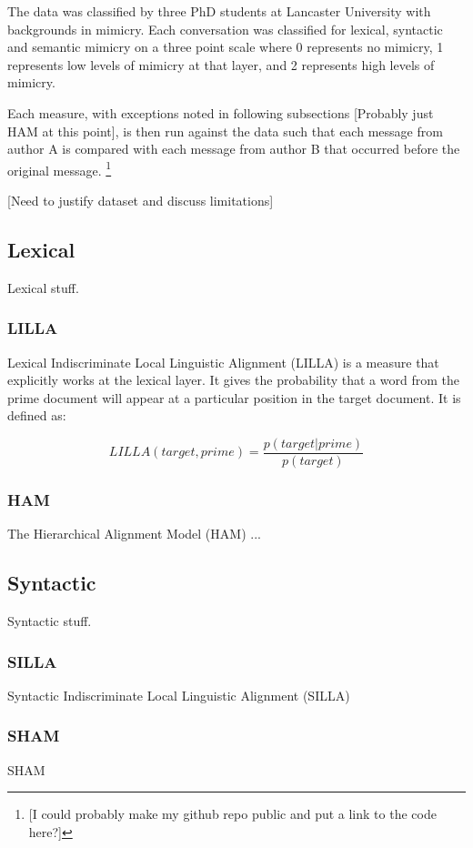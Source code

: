 \documentclass[conference]{IEEEtran}
\begin{document}
The data was classified by three PhD students at Lancaster University with backgrounds in mimicry. Each 
conversation was classified for lexical, syntactic and semantic mimicry on a three point scale where 0 
represents no mimicry, 1 represents low levels of mimicry at that layer, and 2 represents high levels 
of mimicry.

Each measure, with exceptions noted in following subsections [Probably just HAM at this point],
is then run against the data such that each message from author A is compared with each message from 
author B that occurred before the original message.
\footnote{[I could probably make my github repo public and put a link to the code here?]}

[Need to justify dataset and discuss limitations]


\subsection{Lexical}
Lexical stuff.

\subsubsection{LILLA}
Lexical Indiscriminate Local Linguistic Alignment (LILLA)\cite{wang2014linguistic, xu2015evaluation}
is a measure that explicitly works at the lexical layer. It gives the probability that a word from the 
prime document will appear at a particular position in the target document. It is defined as:

\[LILLA(target, prime) = \frac{p(target|prime)}{p(target)}\]


\subsubsection{HAM}
The Hierarchical Alignment Model (HAM)\cite{doyle2016robust} ...


\subsection{Syntactic}
Syntactic stuff.

\subsubsection{SILLA}
Syntactic Indiscriminate Local Linguistic Alignment (SILLA)

\subsubsection{SHAM}
SHAM
\end{document}
